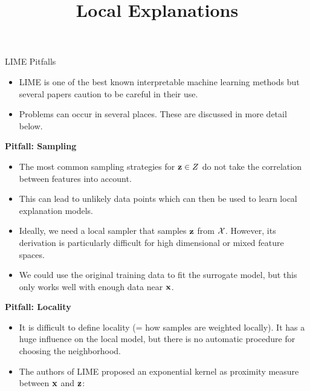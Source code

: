 \documentclass[11pt,compress,t,notes=noshow, xcolor=table]{beamer}
\title{Local Explanations}
\institute{\href{https://compstat-lmu.github.io/lecture_i2ml/}{compstat-lmu.github.io/lecture\_i2ml}}
\date{}
\begin{document}
	
	
	
	
	
	
	
	
	
	


\begin{vbframe}{LIME Pitfalls}
  \begin{itemize}
  	\item LIME is one of the best known interpretable machine learning methods but several papers caution to be careful in their use. 
  	\item Problems can occur in several places. These are discussed in more detail below. 
  \end{itemize}
	\textbf{Pitfall: Sampling}
	\begin{itemize}
	  \item The most common sampling strategies for $\zv \in Z$ do not take the correlation between features into account. 
      \item This can lead to unlikely data points which can then be used to learn local explanation models.
      \item Ideally, we need a local sampler that samples $\zv$ from $\Xspace$. However, its derivation is particularly difficult for high dimensional or mixed feature spaces. 
      \item We could use the original training data to fit the surrogate model, but this only works well with enough data near $\xv$.
    \end{itemize}
\framebreak
	\textbf{Pitfall: Locality}
	\begin{itemize} 
     \item It is difficult to define locality (= how samples are weighted locally). It has a huge influence on the local model, but there is no automatic procedure for choosing the neighborhood.
     \item The authors of LIME proposed an exponential kernel as proximity measure between $\xv$ and $\zv$:

\end{itemize}
\end{vbframe}
\end{document}
